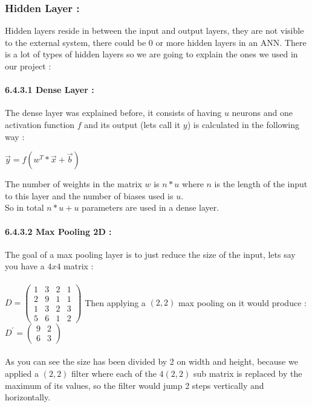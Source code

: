 \documentclass[10pt,a4paper]{article}
\begin{document}
\subsubsection{Hidden Layer :}
Hidden layers reside in between the input and output layers, they are not visible to the external system, there could be 0 or more hidden layers in an ANN. There is a lot of types of hidden layers so we are going to explain the ones we used in our project :
\paragraph{6.4.3.1 Dense Layer :}
The dense layer was explained before, it consists of having $ u $ neurons and one activation function $ f $ and its output (lets call it $ y $) is calculated in the following way :\\
\begin{center}
$ \vec{y} = f(w^{T}*\vec{x} + \vec{b}) $
\end{center}
The number of weights in the matrix $ w $ is $ n*u $ where $ n $ is the length of the input to this layer and the number of biases used is $ u $.\\
So in total $ n*u + u $ parameters are used in a dense layer.
\paragraph{6.4.3.2 Max Pooling 2D :}
The goal of a max pooling layer is to just reduce the size of the input, lets say you have a $ 4x4 $ matrix :\\\\
$D = 
\begin{pmatrix}
1 & 3 & 2 & 1\\
2 & 9 & 1 & 1\\
1 & 3 & 2 & 3\\
5 & 6 & 1 & 2
\end{pmatrix}
$
Then applying a $ (2,2) $ max pooling on it would produce :
$D^{\prime} = 
\begin{pmatrix}
9 & 2\\
6 & 3
\end{pmatrix}
$\\\\
As you can see the size has been divided by 2 on width and height, because we applied a $ (2,2) $ filter where each of the $ 4 (2,2) $ sub matrix is replaced by the maximum of its values, so the filter would jump 2 steps vertically and horizontally.
\end{document}
